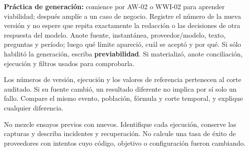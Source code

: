 \textbf{Práctica de generación:} comience por AW-02 o WWI-02 para aprender viabilidad; después amplíe a un caso de negocio. Registre el número de la nueva versión y no espere que repita exactamente la redacción o las decisiones de otra respuesta del modelo.
Anote fuente, instantánea, proveedor/modelo, texto, preguntas y período; luego qué límite apareció, cuál se aceptó y por qué. Si sólo habilitó la generación, escriba \textbf{previabilidad}. Si materializó, anote conciliación, ejecución y filtros usados para comprobarla.
\begin{note}
Los números de versión, ejecución y los valores de referencia pertenecen al corte auditado. Si su fuente cambió, un resultado diferente no implica por sí solo un fallo. Compare el mismo evento, población, fórmula y corte temporal, y explique cualquier diferencia.
\end{note}
No mezcle ensayos previos con nuevos. Identifique cada ejecución, conserve las capturas y describa incidentes y recuperación. No calcule una tasa de éxito de proveedores con intentos cuyo código, objetivo o configuración fueron cambiando.

